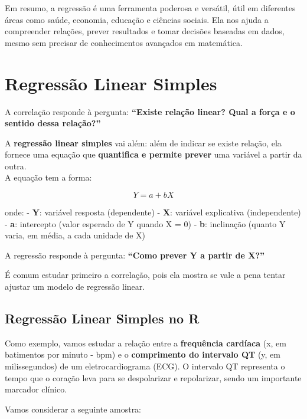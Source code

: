 \documentclass[
]{book}
\begin{document}
Em resumo, a regressão é uma ferramenta poderosa e versátil, útil em diferentes áreas como saúde, economia, educação e ciências sociais. Ela nos ajuda a compreender relações, prever resultados e tomar decisões baseadas em dados, mesmo sem precisar de conhecimentos avançados em matemática.

\section{Regressão Linear Simples}\label{regressuxe3o-linear-simples}

A correlação responde à pergunta: \textbf{``Existe relação linear? Qual a força e o sentido dessa relação?''}

A \textbf{regressão linear simples} vai além: além de indicar se existe relação, ela fornece uma equação que \textbf{quantifica e permite prever} uma variável a partir da outra.\\
A equação tem a forma:

\[
Y = a + bX
\]

onde:
- \textbf{Y}: variável resposta (dependente)
- \textbf{X}: variável explicativa (independente)
- \textbf{a}: intercepto (valor esperado de Y quando X = 0)
- \textbf{b}: inclinação (quanto Y varia, em média, a cada unidade de X)

A regressão responde à pergunta: \textbf{``Como prever Y a partir de X?''}

É comum estudar primeiro a correlação, pois ela mostra se vale a pena tentar ajustar um modelo de regressão linear.

\subsection{Regressão Linear Simples no R}\label{regressuxe3o-linear-simples-no-r}

Como exemplo, vamos estudar a relação entre a \textbf{frequência cardíaca} (x, em batimentos por minuto - bpm) e o \textbf{comprimento do intervalo QT} (y, em milissegundos) de um eletrocardiograma (ECG). O intervalo QT representa o tempo que o coração leva para se despolarizar e repolarizar, sendo um importante marcador clínico.

Vamos considerar a seguinte amostra:
\end{document}
